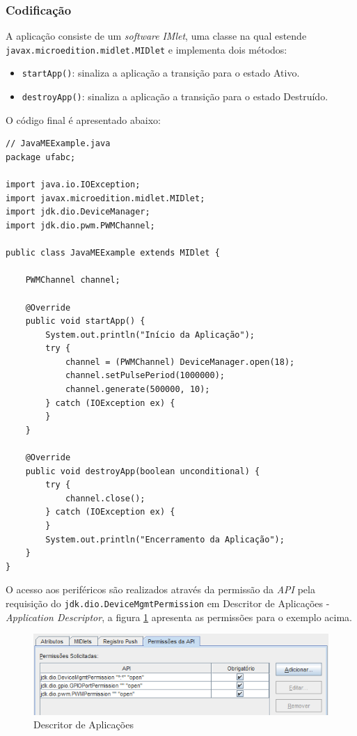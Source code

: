 \subsubsection{Codificação}

A aplicação consiste de um \textit{software} \textit{IMlet}, uma classe na qual
estende \newline
 \verb|javax.microedition.midlet.MIDlet| e implementa dois métodos:

\begin{itemize}

    \item \verb|startApp()|: sinaliza a aplicação a transição para o estado
    Ativo.

    \item \verb|destroyApp()|: sinaliza a aplicação a transição para o estado
    Destruído.

\end{itemize}

O código final é apresentado abaixo:
\newpage
\begin{verbatim}
// JavaMEExample.java
package ufabc;

import java.io.IOException;
import javax.microedition.midlet.MIDlet;
import jdk.dio.DeviceManager;
import jdk.dio.pwm.PWMChannel;

public class JavaMEExample extends MIDlet {

    PWMChannel channel;

    @Override
    public void startApp() {
        System.out.println("Início da Aplicação");
        try {
            channel = (PWMChannel) DeviceManager.open(18);
            channel.setPulsePeriod(1000000);
            channel.generate(500000, 10);
        } catch (IOException ex) {
        }
    }

    @Override
    public void destroyApp(boolean unconditional) {
        try {
            channel.close();
        } catch (IOException ex) {
        }
        System.out.println("Encerramento da Aplicação");
    }
}
\end{verbatim}

O acesso aos periféricos são realizados através da permissão da \textit{API}
pela requisição do \verb|jdk.dio.DeviceMgmtPermission| em Descritor de
Aplicações - \textit{Application Descriptor}, a figura
\ref{fig:java-me/application-descriptor} apresenta as permissões para o exemplo
acima.

\begin{figure}[H]
    \centering
    \includegraphics[width=0.7\linewidth]{figuras/java/java-me-application-descriptor.png}
    \caption{Descritor de Aplicações}
    \label{fig:java-me/application-descriptor}
\end{figure}

